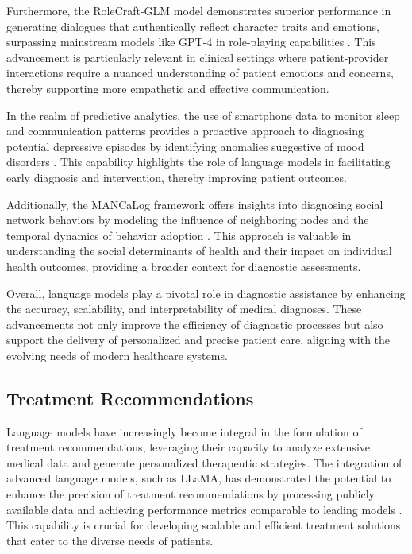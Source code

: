 Furthermore, the RoleCraft-GLM model demonstrates superior performance in generating dialogues that authentically reflect character traits and emotions, surpassing mainstream models like GPT-4 in role-playing capabilities \cite{tao2024rolecraftglmadvancingpersonalizedroleplaying}. This advancement is particularly relevant in clinical settings where patient-provider interactions require a nuanced understanding of patient emotions and concerns, thereby supporting more empathetic and effective communication.



In the realm of predictive analytics, the use of smartphone data to monitor sleep and communication patterns provides a proactive approach to diagnosing potential depressive episodes by identifying anomalies suggestive of mood disorders \cite{jeong2016predictiveanalyticsusingsmartphone}. This capability highlights the role of language models in facilitating early diagnosis and intervention, thereby improving patient outcomes.



Additionally, the MANCaLog framework offers insights into diagnosing social network behaviors by modeling the influence of neighboring nodes and the temporal dynamics of behavior adoption \cite{shakarian2022reasoningcomplexnetworkslogic}. This approach is valuable in understanding the social determinants of health and their impact on individual health outcomes, providing a broader context for diagnostic assessments.



Overall, language models play a pivotal role in diagnostic assistance by enhancing the accuracy, scalability, and interpretability of medical diagnoses. These advancements not only improve the efficiency of diagnostic processes but also support the delivery of personalized and precise patient care, aligning with the evolving needs of modern healthcare systems.



\subsection{Treatment Recommendations} \label{subsec:Treatment Recommendations}



Language models have increasingly become integral in the formulation of treatment recommendations, leveraging their capacity to analyze extensive medical data and generate personalized therapeutic strategies. The integration of advanced language models, such as LLaMA, has demonstrated the potential to enhance the precision of treatment recommendations by processing publicly available data and achieving performance metrics comparable to leading models \cite{touvron2023llama}. This capability is crucial for developing scalable and efficient treatment solutions that cater to the diverse needs of patients.



